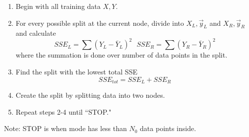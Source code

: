\documentclass[12pt]{article}
\begin{document}
\begin{enumerate}
\begin{enumerate} 
\item Begin with all training data $X,Y$. 
\item For every possible split at the current node, divide into $X_L, \vec{y}_L$ and $X_R, \vec{y}_R$ and calculate $$SSE_L = \sum (Y_L - \bar{Y}_L)^2 ~~~ SSE_R = \sum (Y_R - \bar{Y}_R)^2 $$ where the summation is done over number of data points in the split. 
\item Find the split with the lowest total SSE 
$$SSE_{tot} = SSE_L + SSE_R $$ 
\item Create the split by splitting data into two nodes. 
\item Repeat steps 2-4 until ``STOP." \end{enumerate} 
Note: STOP is when mode has less than $N_0$ data points inside. \newpage

~


\end{enumerate}
\end{document}
